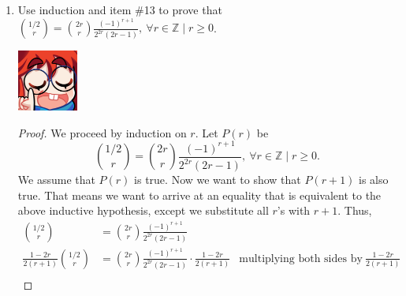 \documentclass{article}
\begin{document}
\begin{enumerate}
\begin{proof}
\begin{align*}
            \frac{1-2r}{2} \cdot \frac{1}{r+1} \cdot \binom{1/2}{r} &= \binom{1/2}{r} \cdot \frac{1-2r}{2(r+1)} \\ 
            \binom{1/2}{r} \cdot \frac{1-2r}{2(r+1)} &= \binom{1/2}{r} \cdot \frac{1-2r}{2(r+1)},
        \end{align*} which shows that the statement is true. 
    \end{proof} 
    \item Use induction and item \#13 to prove that $\displaystyle{} \binom{1/2}{r} = \binom{2r}{r} \frac{{(-1)}^{r+1}}{2^{2r}(2r-1)},~\forall r \in \mathbb{Z} \mid r \geq 0$.\par
    \begin{minipage}[t]{.14\textwidth}
        \vspace{0pt}
        \includegraphics[width=2cm]{nerd_maddy.png} 
    \end{minipage}%
    \begin{proof} 
        We proceed by induction on $r$. Let $P(r)$ be \[  \binom{1/2}{r} = \binom{2r}{r} \frac{{(-1)}^{r+1}}{2^{2r}(2r-1)},~\forall r \in \mathbb{Z} \mid r \geq 0.\] We assume that $P(r)$ is true. Now we want to show that $P(r+1)$ is also true.
        That means we want to arrive at an equality that is equivalent to the above inductive hypothesis, except we substitute all $r$'s with $r+1$. Thus,\begin{align*} 
            \binom{1/2}{r} &= \binom{2r}{r} \frac{{(-1)}^{r+1}}{2^{2r}(2r-1)} \\ 
            \frac{1-2r}{2(r+1)} \binom{1/2}{r} &= \binom{2r}{r} \frac{{(-1)}^{r+1}}{2^{2r}(2r-1)} \cdot \frac{1-2r}{2(r+1)} &\text{multiplying both sides by}~\frac{1-2r}{2(r+1)} \\ 

\end{align*}
\end{proof}
\end{enumerate}
\end{document}
